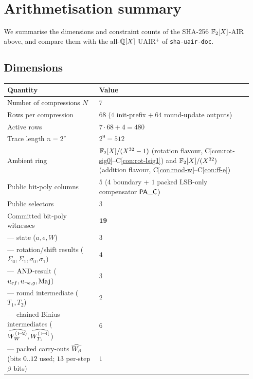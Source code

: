\section{Arithmetisation summary}\label{sec:summary}

We summarise the dimensions and constraint counts of the SHA-256
$\mathbb{F}_2[X]$-AIR above, and compare them with the all-$\mathbb{Q}[X]$ UAIR$^+$ of
\texttt{sha-uair-doc}.

\subsection{Dimensions}

\begin{center}
\small
\begin{tabular}{ll}
\toprule
\textbf{Quantity} & \textbf{Value} \\
\midrule
Number of compressions $N$        & $7$ \\
Rows per compression              & $68$ \quad ($4$ init-prefix $+\ 64$ round-update outputs) \\
Active rows                       & $7 \cdot 68 + 4 = 480$ \\
Trace length $n = 2^{\nu}$        & $2^{9} = 512$ \\
Ambient ring                      & $\mathbb{F}_2[X]/(X^{32}-1)$ (rotation flavour, C\ref{con:rot-sig0}--C\ref{con:rot-lsig1}) and $\mathbb{F}_2[X]/(X^{32})$ (addition flavour, C\ref{con:mod-w}--C\ref{con:ff-e}) \\
\midrule
Public bit-poly columns           & $5$ \quad ($4$ boundary + $1$ packed LSB-only compensator $\mathsf{PA\_C}$) \\
Public selectors                  & $3$ \\
Committed bit-poly witnesses      & $\mathbf{19}$ \\
\quad — state ($a, e, W$)         & $3$ \\
\quad — rotation/shift results ($\Sigma_0, \Sigma_1, \sigma_0, \sigma_1$) & $4$ \\
\quad — $\operatorname{AND}$-result ($u_{ef}, u_{\neg e, g}, \operatorname{Maj}$) & $3$ \\
\quad — round intermediate ($T_1, T_2$) & $2$ \\
\quad — chained-Binius intermediates ($\widehat{W_W^{(1\!-\!2)}}, \widehat{W_{T_1}^{(1\!-\!4)}}$) & $6$ \\
\quad — packed carry-outs $\widehat{W_\beta}$ (bits $0..12$ used; $13$ per-step $\beta$ bits) & $1$ \\

\end{tabular}
\end{center}
